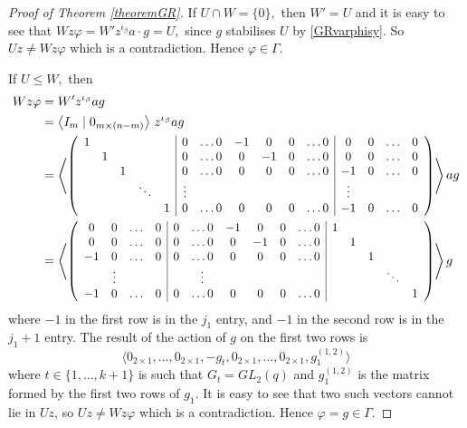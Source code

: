 \begin{proof}[Proof of Theorem {\rm \ref{theoremGR}}]
 If $U \cap W=\{0\},$ then $W'=U$ and it is easy to see that $Wz \varphi = W'z^{\iota_{\beta}}a \cdot g= U,$ since $g$ stabilises $U$ by \eqref{GRvarphisy}. So $Uz \ne Wz \varphi$ which is a contradiction. Hence $\varphi \in \Gamma.$
 
 If $U \le W,$ then 
 \begingroup
\allowdisplaybreaks
 \begin{align*}
 Wz\varphi & = W'z^{\iota_{\beta}}ag \\ & = 
 \left\langle I_m\mid 0_{m \times (n-m)} \right\rangle \, z^{\iota_{\beta}}ag \\
& =\Scale[0.95]{\left \langle \left(\begin{array}{ccccc|cccccc|cccc}
1 &  &   &        &          & 0 & \ldots 0 &-1 & 0 & 0 & \ldots 0 &       0  & 0 & \ldots &  0 \\         
  &1 &   &        &          & 0 & \ldots 0 & 0 &-1 & 0 & \ldots 0 &       0  & 0 & \ldots &  0 \\
  &  &1  &        &          & 0 & \ldots 0 & 0 &0  & 0 & \ldots 0 &       -1 & 0 & \ldots &  0 \\
  &  &   & \ddots &          & \vdots &     &   &   &   &          &   \vdots &   &        &    \\
  &  &   &        &1         & 0 & \ldots 0 & 0 &0  & 0 & \ldots 0 &       -1 & 0 & \ldots &  0 \\ 
\end{array}\right)
\right \rangle}\, a g\\
& = \Scale[0.95]{ \left \langle \left(\begin{array}{cccc|cccccc|ccccc}
 0  & 0 & \ldots &  0          & 0 & \ldots 0 &-1 & 0 & 0 & \ldots 0 &       1 &  &   &        & \\         
 0  & 0 & \ldots &  0        & 0 & \ldots 0 & 0 &-1 & 0 & \ldots 0 &         &1 &   &        &   \\
 -1 & 0 & \ldots &  0         & 0 & \ldots 0 & 0 &0  & 0 & \ldots 0 &         &  &1  &        &  \\
  &   \vdots &   &        &            & \vdots &     &   &   &   &           &  &   & \ddots &  \\
  -1 & 0 & \ldots &  0        & 0 & \ldots 0 & 0 &0  & 0 & \ldots 0 &        &  &   &        &1  \\ 
\end{array}\right)
\right \rangle}\, g
 \end{align*}
 \endgroup
 where $-1$ in the first row is in the $j_1$ entry, and $-1$ in the second row is in the $j_1+1$ entry. The result of the action of $g$ on the first two rows is 
 $$\langle 0_{2\times 1}, \ldots, 0_{2\times 1}, -g_t, 0_{2\times 1}, \ldots, 0_{2\times 1}, g_1^{(1,2)} \rangle $$ where $t \in \{1, \ldots, k+1\}$ is such that $G_t=GL_2(q)$ and $g_1^{(1,2)}$ is the matrix formed by the first two rows of $g_1.$ It is easy to see that  two such vectors cannot lie in $Uz$, so  $Uz \ne Wz \varphi$ which is a contradiction. Hence $\varphi =g\in \Gamma.$ 
 

\end{proof}
